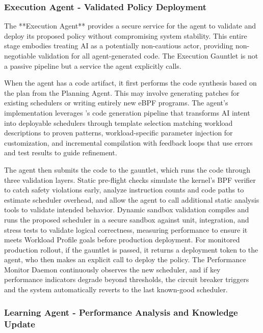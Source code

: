 \subsubsection{Execution Agent - Validated Policy Deployment}

The **Execution Agent** provides a secure service for the agent to validate and deploy its proposed policy without compromising system stability. This entire stage embodies treating AI as a potentially non-cautious actor, providing non-negotiable validation for all agent-generated code. The Execution Gauntlet is not a passive pipeline but a service the agent explicitly calls.

When the agent has a code artifact, it first performs the code synthesis based on the plan from the Planning Agent. This may involve generating patches for existing schedulers or writing entirely new eBPF programs. The agent's implementation leverages \sys's code generation pipeline that transforms AI intent into deployable schedulers through template selection matching workload descriptions to proven patterns, workload-specific parameter injection for customization, and incremental compilation with feedback loops that use errors and test results to guide refinement.

The agent then submits the code to the gauntlet, which runs the code through three validation layers. Static pre-flight checks simulate the kernel's BPF verifier to catch safety violations early, analyze instruction counts and code paths to estimate scheduler overhead, and allow the agent to call additional static analysis tools to validate intended behavior. Dynamic sandbox validation compiles and runs the proposed scheduler in a secure sandbox against unit, integration, and stress tests to validate logical correctness, measuring performance to ensure it meets Workload Profile goals before production deployment. For monitored production rollout, if the gauntlet is passed, it returns a deployment token to the agent, who then makes an explicit call to deploy the policy. The Performance Monitor Daemon continuously observes the new scheduler, and if key performance indicators degrade beyond thresholds, the circuit breaker triggers and the system automatically reverts to the last known-good scheduler.

\subsubsection{Learning Agent - Performance Analysis and Knowledge Update}

